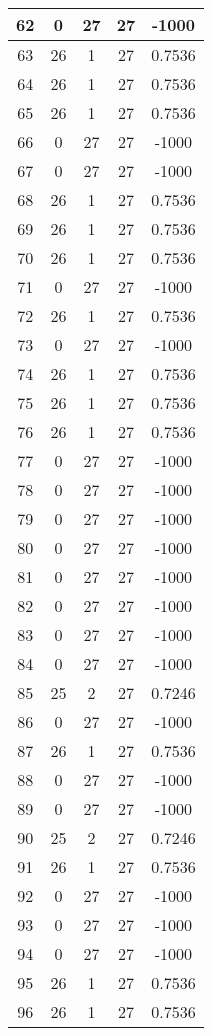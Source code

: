 \documentclass[letterpaper, 12pt]{article}
\begin{document}
\begin{longtable}{|c|c|c|c|c|}
\hline
62 & 0 & 27 & 27 & -1000 \\
\hline
63 & 26 & 1 & 27 & 0.7536 \\
\hline
64 & 26 & 1 & 27 & 0.7536 \\
\hline
65 & 26 & 1 & 27 & 0.7536 \\
\hline
66 & 0 & 27 & 27 & -1000 \\
\hline
67 & 0 & 27 & 27 & -1000 \\
\hline
68 & 26 & 1 & 27 & 0.7536 \\
\hline
69 & 26 & 1 & 27 & 0.7536 \\
\hline
70 & 26 & 1 & 27 & 0.7536 \\
\hline
71 & 0 & 27 & 27 & -1000 \\
\hline
72 & 26 & 1 & 27 & 0.7536 \\
\hline
73 & 0 & 27 & 27 & -1000 \\
\hline
74 & 26 & 1 & 27 & 0.7536 \\
\hline
75 & 26 & 1 & 27 & 0.7536 \\
\hline
76 & 26 & 1 & 27 & 0.7536 \\
\hline
77 & 0 & 27 & 27 & -1000 \\
\hline
78 & 0 & 27 & 27 & -1000 \\
\hline
79 & 0 & 27 & 27 & -1000 \\
\hline
80 & 0 & 27 & 27 & -1000 \\
\hline
81 & 0 & 27 & 27 & -1000 \\
\hline
82 & 0 & 27 & 27 & -1000 \\
\hline
83 & 0 & 27 & 27 & -1000 \\
\hline
84 & 0 & 27 & 27 & -1000 \\
\hline
85 & 25 & 2 & 27 & 0.7246 \\
\hline
86 & 0 & 27 & 27 & -1000 \\
\hline
87 & 26 & 1 & 27 & 0.7536 \\
\hline
88 & 0 & 27 & 27 & -1000 \\
\hline
89 & 0 & 27 & 27 & -1000 \\
\hline
90 & 25 & 2 & 27 & 0.7246 \\
\hline
91 & 26 & 1 & 27 & 0.7536 \\
\hline
92 & 0 & 27 & 27 & -1000 \\
\hline
93 & 0 & 27 & 27 & -1000 \\
\hline
94 & 0 & 27 & 27 & -1000 \\
\hline
95 & 26 & 1 & 27 & 0.7536 \\
\hline
96 & 26 & 1 & 27 & 0.7536 \\

\end{longtable}
\end{document}
